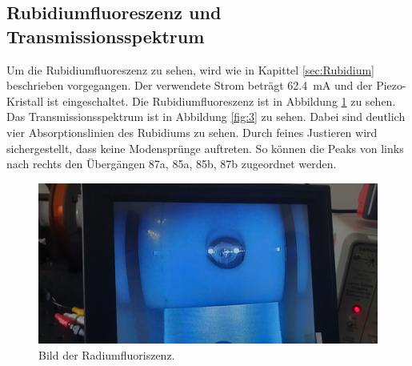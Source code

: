 \subsection{Rubidiumfluoreszenz und Transmissionsspektrum}

Um die Rubidiumfluoreszenz zu sehen, wird wie in Kapittel \ref{sec:Rubidium} beschrieben vorgegangen.
Der verwendete Strom beträgt \SI{62.4}{\milli\ampere} und der Piezo-Kristall ist eingeschaltet.
Die Rubidiumfluoreszenz ist in Abbildung \ref{fig:2} zu sehen.
Das Transmissionsspektrum ist in Abbildung \ref{fig:3} zu sehen.
Dabei sind deutlich vier Absorptionslinien des Rubidiums zu sehen. 
Durch feines Justieren wird sichergestellt, dass keine Modensprünge auftreten. 
So können die Peaks von links nach rechts den Übergängen 87a, 85a, 85b, 87b zugeordnet werden.

\begin{figure}
    \centering
    \includegraphics[width= \textwidth]{plots/Fluoreszenz_1.jpg}
    \caption{Bild der Radiumfluoriszenz.}
    \label{fig:2}
\end{figure}

